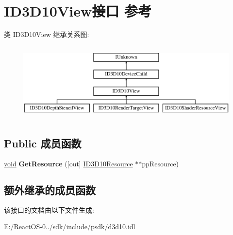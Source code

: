 \hypertarget{interface_i_d3_d10_view}{}\section{I\+D3\+D10\+View接口 参考}
\label{interface_i_d3_d10_view}
类 I\+D3\+D10\+View 继承关系图\+:\begin{figure}[H]
\begin{center}
\leavevmode
\includegraphics[height=4.000000cm]{interface_i_d3_d10_view}
\end{center}
\end{figure}
\subsection*{Public 成员函数}
\begin{DoxyCompactItemize}
\item 
\mbox{\label{interface_i_d3_d10_view_add7a5c705a21443fb8788c747c5f1494}} 
\hyperlink{interfacevoid}{void} {\bfseries Get\+Resource} (\mbox{[}out\mbox{]} \hyperlink{interface_i_d3_d10_resource}{I\+D3\+D10\+Resource} $\ast$$\ast$pp\+Resource)
\end{DoxyCompactItemize}
\subsection*{额外继承的成员函数}


该接口的文档由以下文件生成\+:\begin{DoxyCompactItemize}
\item 
E\+:/\+React\+O\+S-\/0../sdk/include/psdk/d3d10.\+idl\end{DoxyCompactItemize}
